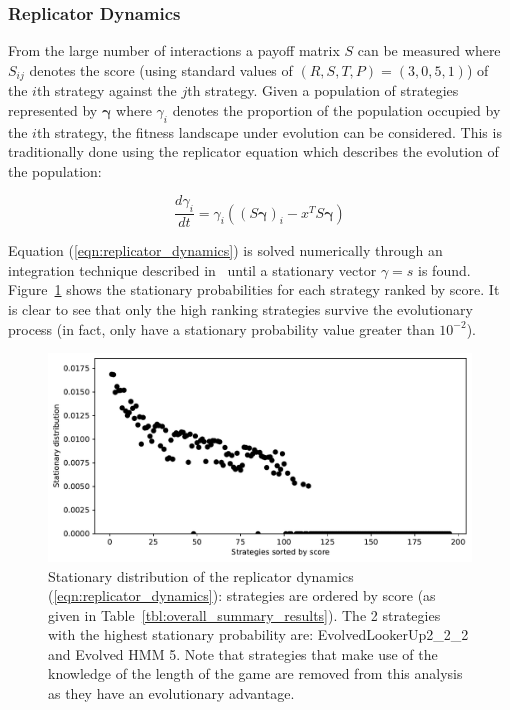 \documentclass[a4paper]{article}
\begin{document}
\subsubsection{Replicator Dynamics}

From the large number of interactions a payoff matrix \(S\) can be measured
where \(S_{ij}\) denotes the score (using standard values of \((R, S, T, P) =
(3, 0, 5, 1)\)) of the \(i\)th strategy against the \(j\)th strategy. Given a
population of strategies represented by \(\boldsymbol{\gamma}\) where \(\gamma_i\)
denotes the proportion of the population occupied by the \(i\)th strategy, the
fitness landscape under evolution can be considered. This is traditionally done
using the replicator equation which describes the evolution of the population:

\begin{equation}\label{eqn:replicator_dynamics}
    \frac{d \gamma_i}{dt} = \gamma_i ((S\boldsymbol{\gamma})_i - x^T S \boldsymbol{\gamma})
\end{equation}

Equation (\ref{eqn:replicator_dynamics}) is solved numerically through an
integration technique described in~\cite{Petzold1983} until a stationary vector
\(\gamma=s\) is found.
Figure~\ref{fig:replicator_dynamics} shows the stationary probabilities for each
strategy ranked by score.
It is clear to see that
only the high ranking strategies survive the evolutionary process (in fact,
only have a stationary
probability value greater than \(10 ^ {-2}\)).

\begin{figure}[!htbp]
    \centering
    \includegraphics[width=.8\textwidth]{./assets/img/replicator_dynamics/main.pdf}
    \caption{Stationary distribution of the replicator dynamics
    (\ref{eqn:replicator_dynamics}): strategies are ordered by score (as given
    in Table~\ref{tbl:overall_summary_results}). The 2
    strategies with the highest stationary probability are:
    EvolvedLookerUp2\_2\_2 and Evolved HMM 5.
    Note that
    strategies that make use of the knowledge of the length of the game are
    removed from this analysis as they have an evolutionary advantage.}
    \label{fig:replicator_dynamics}
\end{figure}
\end{document}
